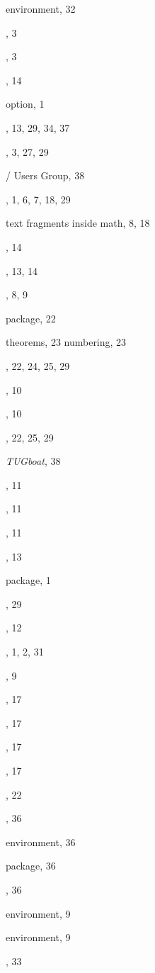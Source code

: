 \documentclass[leqno,titlepage,openany]{amsldoc}
\newcommand{\journalname}[1]{\textit{#1}}
\begin{document}
\begin{theindex}
  \item {} environment, 32
  \item {}, 3
  \item {}, 3
  \item {}, 14
  \item {} option, 1
  \item {}, 13, 29, 34, 37
  \item {}, 3, 27, 29
  \item \tex/ Users Group, 38
  \item {}, 1, 6, 7, 18, 29
  \item text fragments inside math, 8, 18
  \item {}, 14
  \item {}, 13, 14
  \item {}, 8, 9
  \item {} package, 22
  \item theorems, 23
    \subitem numbering, 23
  \item {}, 22, 24, 25, 29
  \item {}, 10
  \item {}, 10
  \item {}, 22, 25, 29
  \item \journalname{TUGboat}, 38

  \indexspace

  \item {}, 11
  \item {}, 11
  \item {}, 11
  \item {}, 13
  \item {} package, 1
  \item {}, 29
  \item {}, 12
  \item {}, 1, 2, 31

  \indexspace

  \item {}, 9
  \item {}, 17
  \item {}, 17
  \item {}, 17
  \item {}, 17
  \item {}, 22
  \item {}, 36
  \item {} environment, 36
  \item {} package, 36
  \item {}, 36
  \item {} environment, 9
  \item {} environment, 9
  \item {}, 33


\end{theindex}
\end{document}
